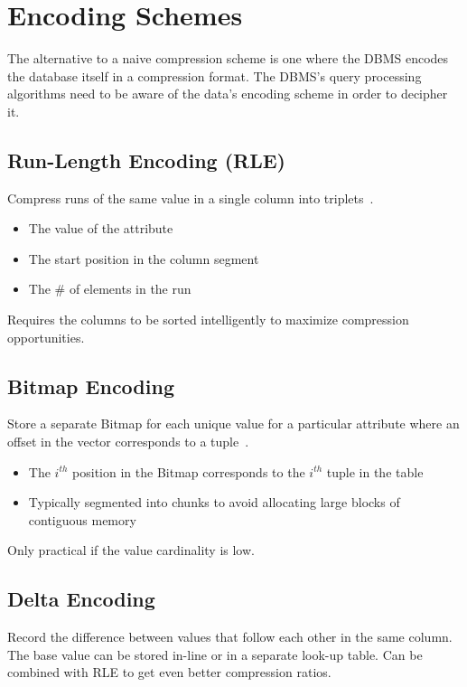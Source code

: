 \documentclass[11pt]{article}
\begin{document}
\section{Encoding Schemes}
The alternative to a naive compression scheme is one where the DBMS encodes the database itself in 
a compression format. The DBMS's query processing algorithms need to be aware of the data's 
encoding scheme in order to decipher it.


\subsection{Run-Length Encoding (RLE)}
Compress runs of the same value in a single column into triplets~\cite{p31-roth}.
\begin{itemize}
    \item The value of the attribute
    \item The start position in the column segment
    \item The \# of elements in the run
\end{itemize}
Requires the columns to be sorted intelligently to maximize compression opportunities.

\subsection{Bitmap Encoding}
Store a separate Bitmap for each unique value for a particular attribute where an offset 
in the vector corresponds to a tuple~\cite{franklin14}.
\begin{itemize}
    \item The $i^{th}$ position in the Bitmap corresponds to the $i^{th}$ tuple in the table
    \item Typically segmented into chunks to avoid allocating large blocks of contiguous memory
\end{itemize}
Only practical if the value cardinality is low.

\subsection{Delta Encoding}
Record the difference between values that follow each other in the same column.
The base value can be stored in-line or in a separate look-up table.
Can be combined with RLE to get even better compression ratios.
\end{document}
